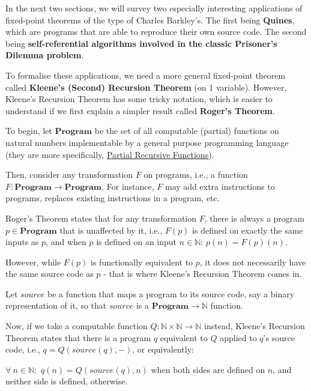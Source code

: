 In the next two sections, we will survey two especially interesting applications of fixed-point theorems of the type of Charles Barkley's. The first being \textbf{Quines}, which are programs that are able to reproduce their own source code. The second being \textbf{self-referential algorithms involved in the classic Prisoner's Dilemma problem}.

To formalise these applications, we need a more general fixed-point theorem called \textbf{Kleene's (Second) Recursion Theorem} (on 1 variable). However, Kleene's Recursion Theorem has some tricky notation, which is easier to understand if we first explain a simpler result called \textbf{Roger's Theorem}.

To begin, let $\textbf{Program}$ be the set of all computable (partial) functions on natural numbers implementable by a general purpose programming language (they are more specifically, \href{https://en.wikipedia.org/wiki/General_recursive_function}{Partial Recursive Functions}).

Then, consider any transformation $F$ on programs, i.e., a function $F: \textbf{Program} \rightarrow \textbf{Program}$. For instance, $F$ may add extra instructions to programs, replaces existing instructions in a program, etc.

Roger's Theorem states that for any transformation $F$, there is always a program $p \in \textbf{Program}$ that is unaffected by it, i.e., $F(p)$ is defined on exactly the same inputs as $p$, and when $p$ is defined on an input $n \in \mathbb{N}$: $p(n) = F(p)(n)$.

However, while $F(p)$ is functionally equivalent to $p$, it does not necessarily have the same source code as $p$ - that is where Kleene's Recursion Theorem comes in.

Let $source$ be a function that maps a program to its source code, say a binary representation of it, so that $source$ is a $\textbf{Program} \rightarrow \mathbb{N}$ function.

Now, if we take a computable function $Q: \mathbb{N} \times \mathbb{N} \rightarrow \mathbb{N}$ instead, Kleene's Recursion Theorem states that there is a program $q$ equivalent to $Q$ applied to $q$'s source code, i.e., $q = Q(source(q), -)$, or equivalently:
\begin{center*}
    $\forall\ n \in \mathbb{N}:$ $q(n) = Q(source(q), n)$ when both sides are defined on $n$, and neither side is defined, otherwise.
\end{center*}




